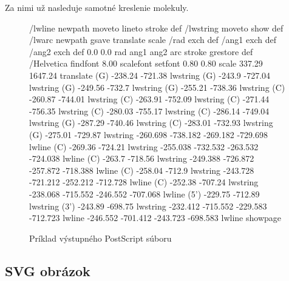 Za nimi už nasleduje samotné kreslenie molekuly.

\begin{figure}
\begin{code}[fontsize=\scriptsize, frame=none, samepage=true]
/lwline {newpath moveto lineto stroke} def
/lwstring {moveto show} def
/lwarc {newpath gsave translate scale /rad exch def /ang1 exch def
  /ang2 exch def 0.0 0.0 rad ang1 ang2 arc stroke grestore} def
/Helvetica findfont 8.00 scalefont setfont
0.80 0.80 scale
337.29 1647.24 translate
(G)            -238.24        -721.38        lwstring       
(G)            -243.9         -727.04        lwstring       
(G)            -249.56        -732.7         lwstring       
(G)            -255.21        -738.36        lwstring       
(C)            -260.87        -744.01        lwstring       
(C)            -263.91        -752.09        lwstring       
(C)            -271.44        -756.35        lwstring       
(C)            -280.03        -755.17        lwstring       
(C)            -286.14        -749.04        lwstring       
(G)            -287.29        -740.46        lwstring       
(C)            -283.01        -732.93        lwstring       
(G)            -275.01        -729.87        lwstring       
-260.698       -738.182       -269.182       -729.698        lwline
(C)            -269.36        -724.21        lwstring       
-255.038       -732.532       -263.532       -724.038        lwline
(C)            -263.7         -718.56        lwstring       
-249.388       -726.872       -257.872       -718.388        lwline
(C)            -258.04        -712.9         lwstring       
-243.728       -721.212       -252.212       -712.728        lwline
(C)            -252.38        -707.24        lwstring       
-238.068       -715.552       -246.552       -707.068        lwline
(5')           -229.75        -712.89        lwstring
(3')           -243.89        -698.75        lwstring
-232.412       -715.552       -229.583       -712.723        lwline
-246.552       -701.412       -243.723       -698.583        lwline
showpage
\end{code}
\caption{Príklad výstupného PostScript súboru}
\label{obr:ps_out}
\end{figure}



\newcommand{\tagt}[1]{\mbox{$<$\textit{#1}$>$}}

\subsection{SVG obrázok}

